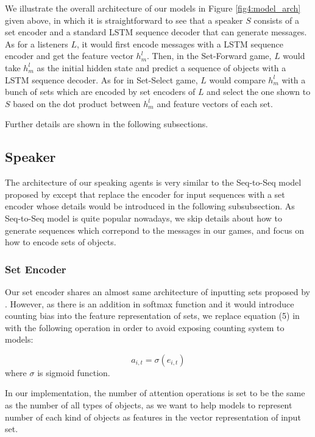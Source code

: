 We illustrate the overall architecture of our models in Figure \ref{fig4:model_arch} given above, in which it is straightforward to see that a speaker $S$ consists of a set encoder and a standard LSTM sequence decoder that can generate messages. As for a listeners $L$, it would first encode messages with a LSTM sequence encoder and get the feature vector $h^l_m$. Then, in the Set-Forward game, $L$ would take $h^l_m$ as the initial hidden state and predict a sequence of objects with a LSTM sequence decoder. As for in Set-Select game, $L$ would compare $h^l_m$ with a bunch of sets which are encoded by set encoders of $L$ and select the one shown to $S$ based on the dot product between $h^l_m$ and feature vectors of each set.

Further details are shown in the following subsections.

\subsection{Speaker}
\label{ssec3.2.1:speaker}

The architecture of our speaking agents is very similar to the Seq-to-Seq model proposed by \cite{sutskever2014sequence} except that replace the encoder for input sequences with a set encoder whose details would be introduced in the following subsubsection. As Seq-to-Seq model is quite popular nowadays, we skip details about how to generate sequences which correpond to the messages in our games, and focus on how to encode sets of objects.

\subsubsection{Set Encoder}
\label{sssec3.2.1.1:set_encoder}

Our set encoder shares an almost same architecture of inputting sets proposed by \cite{vinyals2015order}. However, as there is an addition in softmax function and it would introduce counting bias into the feature representation of sets, we replace equation (5) in \cite{vinyals2015order} with the following operation in order to avoid exposing counting system to models:

\begin{equation}
  a_{i,t} = \sigma(e_{i,t})
  \label{eq3.2.1.1:sigmoid_to_replace_softmax}
\end{equation}
where $\sigma$ is sigmoid function.

In our implementation, the number of attention operations is set to be the same as the number of all types of objects, as we want to help models to represent number of each kind of objects as features in the vector representation of input set.

